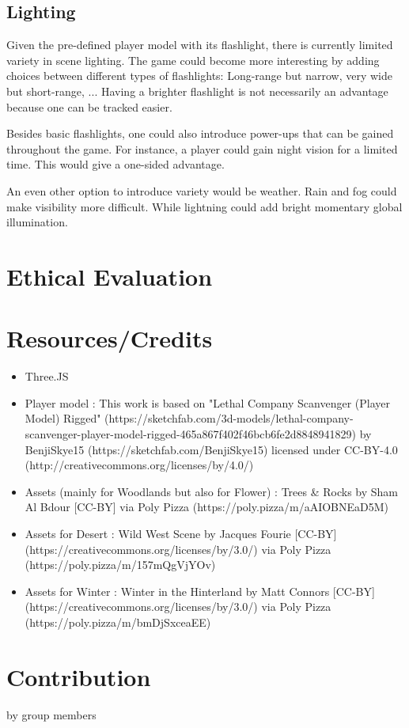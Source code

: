 \documentclass[11pt]{article}
\begin{document}
\subsection{Lighting}
\par Given the pre-defined player model with its flashlight, there is currently limited variety in scene lighting. The game could become more interesting by adding choices between different types of flashlights: Long-range but narrow, very wide but short-range, ... Having a brighter flashlight is not necessarily an advantage because one can be tracked easier.
\par Besides basic flashlights, one could also introduce power-ups that can be gained throughout the game. For instance, a player could gain night vision for a limited time. This would give a one-sided advantage.
\par An even other option to introduce variety would be weather. Rain and fog could make visibility more difficult. While lightning could add bright momentary global illumination.





\section{Ethical Evaluation}





\section{Resources/Credits}
\begin{itemize}
	\item Three.JS
	\item Player model : This work is based on "Lethal Company Scanvenger (Player Model) Rigged" (https://sketchfab.com/3d-models/lethal-company-scanvenger-player-model-rigged-465a867f402f46bcb6fe2d8848941829) by BenjiSkye15 (https://sketchfab.com/BenjiSkye15) licensed under CC-BY-4.0 (http://creativecommons.org/licenses/by/4.0/)
	\item Assets (mainly for Woodlands but also for Flower) : Trees & Rocks by Sham Al Bdour [CC-BY] via Poly Pizza (https://poly.pizza/m/aAIOBNEaD5M)
	\item Assets for Desert :  Wild West Scene by Jacques Fourie [CC-BY] (https://creativecommons.org/licenses/by/3.0/) via Poly Pizza (https://poly.pizza/m/157mQgVjYOv)
	\item Assets for Winter : Winter in the Hinterland by Matt Connors [CC-BY] (https://creativecommons.org/licenses/by/3.0/) via Poly Pizza (https://poly.pizza/m/bmDjSxceaEE)
\end{itemize}



\section{Contribution}
by group members
\end{document}
